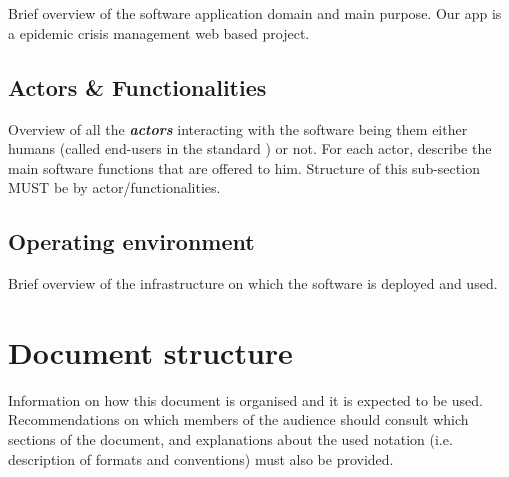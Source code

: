 \section{\mysystemname}
Brief overview of the software application domain and main purpose.
Our app is a epidemic crisis management web based project. 

\subsection{Actors \& Functionalities}
Overview of all the \textbf{\emph{\glspl{actor}}} interacting with the software
being them either humans (called end-users in the standard
\cite{IEEE-2001-userdocumentation}) or not. For each actor, describe the main
software functions that are offered to him. Structure of this sub-section MUST
be by actor/functionalities.


\subsection{Operating environment}
Brief overview of the infrastructure on which the software is deployed and used.

\section{Document structure}  
Information on how this document is organised and it is expected to be
used. Recommendations on which members of the audience
should consult which sections of the document, and explanations about the used
notation (i.e. description of formats and conventions) must also be provided.



\glsaddall
\printglossaries

